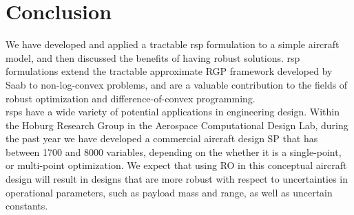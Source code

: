 \section{Conclusion}

We have developed and applied a tractable \gls{rsp} formulation to a simple aircraft model,
and then discussed the benefits of having robust solutions. \gls{rsp} formulations extend
the tractable approximate RGP framework developed by Saab to non-log-convex problems,
and are a valuable contribution to the fields of robust optimization and difference-of-convex programming.\\

\gls{rsp}s have a wide variety of potential applications in engineering design.
Within the Hoburg Research Group in the Aerospace Computational Design Lab, during the past year we
have developed a commercial aircraft design SP that has between 1700 and 8000 variables,
depending on the whether it is a single-point, or multi-point optimization.
We expect that using RO in this conceptual aircraft design will result in designs
that are more robust with respect to uncertainties in operational parameters,
such as payload mass and range, as well as uncertain constants.
